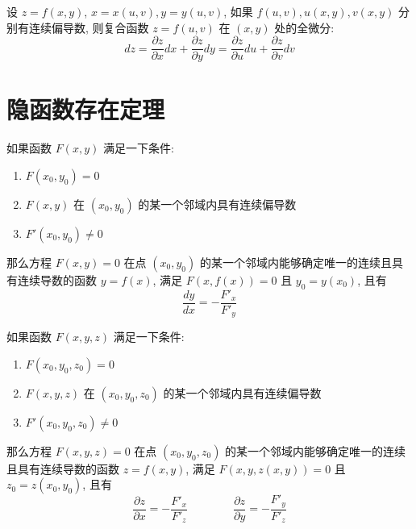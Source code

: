 \begin{definition}[全微分形式不变性]
	设 $z=f(x,y)$, $x=x(u,v),y=y(u,v)$, 如果 $f(u,v),u(x,y),v(x,y)$ 分别有连续偏导数, 则复合函数 $z=f(u,v)$ 在 $(x,y)$ 处的全微分:
	$$dz=\dfrac{\partial z}{\partial x}dx+\dfrac{\partial z}{\partial y}dy=\dfrac{\partial z}{\partial u}du+\dfrac{\partial z}{\partial v}dv$$
\end{definition}
\section{隐函数存在定理}

\begin{theorem}[隐函数存在定理 1]\label{the: 隐函数存在定理}
	如果函数 $F(x,y)$ 满足一下条件:
	\begin{enumerate}
		\item $F(x_{0},y_{0}) = 0$
		\item $F(x,y)$ 在 $(x_{0},y_{0})$ 的某一个邻域内具有连续偏导数
		\item $F'(x_{0},y_{0})\neq 0$
	\end{enumerate}
	那么方程 $F(x,y)=0$ 在点 $(x_{0},y_{0})$ 的某一个邻域内能够确定唯一的连续且具有连续导数的函数 $y=f(x)$, 满足 $F(x,f(x))=0$ 且 $y_{0} = y(x_{0})$, 且有
	$$\dfrac{dy}{dx} = -\dfrac{F'_{x}}{F'_{y}}$$
\end{theorem}
\begin{theorem}[隐函数存在定理 2]
	如果函数 $F(x,y,z)$ 满足一下条件:
	\begin{enumerate}
		\item $F(x_{0},y_{0},z_{0}) = 0$
		\item $F(x,y,z)$ 在 $(x_{0},y_{0},z_{0})$ 的某一个邻域内具有连续偏导数
		\item $F'(x_{0},y_{0},z_{0})\neq 0$
	\end{enumerate}
	那么方程 $F(x,y,z)=0$ 在点 $(x_{0},y_{0},z_{0})$ 的某一个邻域内能够确定唯一的连续且具有连续导数的函数 $z=f(x,y)$, 满足 $F(x,y,z(x,y))=0$ 且 $z_{0} = z(x_{0},y_{0})$, 且有
	$$\dfrac{\partial z}{\partial x} = -\dfrac{F'_{x}}{F'_{z}}\qquad\qquad \dfrac{\partial z}{\partial y} = -\dfrac{F'_{y}}{F'_{z}}$$
\end{theorem}
